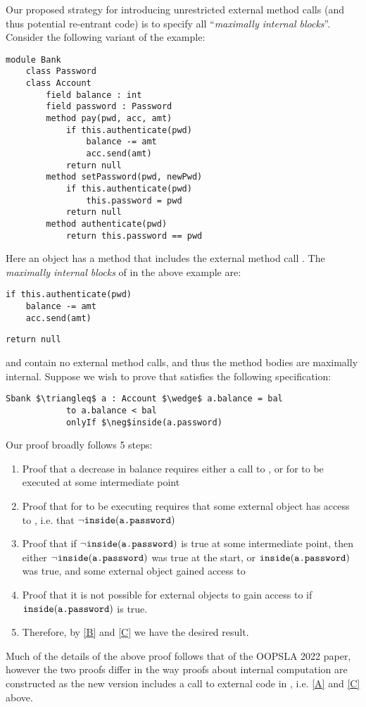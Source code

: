 \documentclass[11pt]{article} %
\theoremstyle{definition}
\begin{document}
Our proposed strategy for introducing unrestricted external method calls (and thus potential re-entrant code)
is to specify all ``\emph{maximally internal blocks}''. Consider the following variant of the 
example:
\begin{lstlisting}[language = Chainmail, mathescape=true, frame=lines]
module Bank
	class Password
	class Account
		field balance : int
		field password : Password
		method pay(pwd, acc, amt)
			if this.authenticate(pwd)
				balance -= amt
				acc.send(amt)
			return null
		method setPassword(pwd, newPwd)
			if this.authenticate(pwd)
				this.password = pwd
			return null
		method authenticate(pwd)
			return this.password == pwd
\end{lstlisting}
Here an  object has a  method that includes the external method call .
The \emph{maximally internal blocks} of  in the above example are:
\begin{lstlisting}[language = Chainmail, frame = lines]
if this.authenticate(pwd)
	balance -= amt
	acc.send(amt)
\end{lstlisting}
\begin{lstlisting}[language = Chainmail, frame = lines]
return null
\end{lstlisting}
 and  contain no external method calls, and thus the method bodies are maximally internal.
Suppose we wish to prove that  satisfies the following specification:
\begin{lstlisting}[language = Chainmail, frame = lines, mathescape = true]
Sbank $\triangleq$ a : Account $\wedge$ a.balance = bal
			to a.balance < bal
			onlyIf $\neg$inside(a.password)
\end{lstlisting}
Our proof broadly follows 5 steps:
\begin{enumerate}
\item
\label{A}
Proof that a decrease in balance requires either a call to , or for  to be executed at some intermediate point 
\item
Proof that for  to be executing requires that some external object has access to , i.e. that $\neg\texttt{inside}( {\texttt{a.password}} )$
\item
\label{B}
Proof that if $\neg\texttt{inside}( {\texttt{a.password}} )$ is true at some intermediate point, then either $\neg\texttt{inside}( {\texttt{a.password}} )$ was true at the start,
or $\texttt{inside}( {\texttt{a.password}} )$ was true, and some external object gained access to 
\item
\label{C}
Proof that it is not possible for external objects to gain access to  if $\texttt{inside}( {\texttt{a.password}} )$ is true.
\item
Therefore, by \ref{B} and \ref{C} we have the desired result.
\end{enumerate}
Much of the details of the above proof follows that of the OOPSLA 2022 paper, however the two proofs differ in the way proofs about internal 
computation are constructed as the new version includes a call to external code in , i.e. \ref{A} and \ref{C} above.
\end{document}
